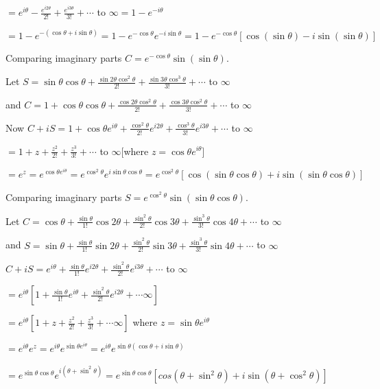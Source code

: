   $= e^{i\theta} - \frac{e^{i2\theta}}{2!} + \frac{e^{i3\theta}}{3!} + \cdots$ to $\infty = 1 -
  e^{-i\theta}$

  $= 1 - e^{-(\cos\theta + i\sin\theta)} = 1 - e^{-\cos\theta}e^{-i\sin\theta} = 1 -
  e^{-\cos\theta}[\cos(\sin\theta) - i\sin(\sin\theta)]$

  Comparing imaginary parts $C = e^{-\cos\theta}\sin(\sin\theta)$.
\item Let $S = \sin\theta\cos\theta + \frac{\sin2\theta\cos^2\theta}{2!} +
  \frac{\sin3\theta\cos^3\theta}{3!} + \cdots $ to $\infty$

  and $C = 1 + \cos\theta\cos\theta + \frac{\cos2\theta\cos^2\theta}{2!} +
  \frac{\cos3\theta\cos^2\theta}{3!} + \cdots$ to $\infty$

  Now $C + iS = 1 + \cos\theta e^{i\theta} + \frac{\cos^2\theta}{2!}e^{i2\theta} +
  \frac{\cos^3\theta}{3!}e^{i3\theta} + \cdots$ to $\infty$

  $= 1 + z + \frac{z^2}{2!} + \frac{z^3}{3!} + \cdots$ to $\infty$[where $z = \cos\theta e^{i\theta}$]

  $ = e^z = e^{\cos\theta e^{i\theta}} = e^{\cos^2\theta}e^{i\sin\theta\cos\theta} =
  e^{\cos^2\theta}[\cos(\sin\theta\cos\theta) + i\sin(\sin\theta\cos\theta)]$

  Comparing imaginary parts $S = e^{\cos^2\theta}\sin(\sin\theta\cos\theta)$.
\item Let $C = \cos\theta + \frac{\sin\theta}{1!}\cos2\theta + \frac{\sin^2\theta}{2!}\cos3\theta +
  \frac{\sin^3\theta}{3!}\cos4\theta + \cdots$ to $\infty$

  and $S = \sin\theta + \frac{\sin\theta}{1!}\sin2\theta + \frac{\sin^2\theta}{2!}\sin3\theta +
  \frac{\sin^3\theta}{3!}\sin4\theta + \cdots$ to $\infty$

  $C + iS = e^{i\theta} + \frac{\sin\theta}{1!}e^{i2\theta} + \frac{\sin^2\theta}{2!}e^{i3\theta} + \cdots$
  to $\infty$

  $= e^{i\theta}\left[1 + \frac{\sin\theta}{1!}e^{i\theta} + \frac{\sin^2\theta}{2!}e^{i2\theta} + \cdots
    \infty\right]$

  $= e^{i\theta}\left[1 + z + \frac{z^2}{2!} + \frac{z^3}{3!} + \cdots \infty\right]$ where $z = \sin\theta
  e^{i\theta}$

  $= e^{i\theta}e^z = e^{i\theta}e^{\sin\theta e^{i\theta}} = e^{i\theta}e^{\sin\theta(\cos\theta +
    i\sin\theta)}$

  $= e^{\sin\theta\cos\theta}e^{i(\theta + \sin^2\theta)} = e^{\sin\theta\cos\theta}[cos(\theta +
    \sin^2\theta) + i\sin(\theta + \cos^2\theta)]$

